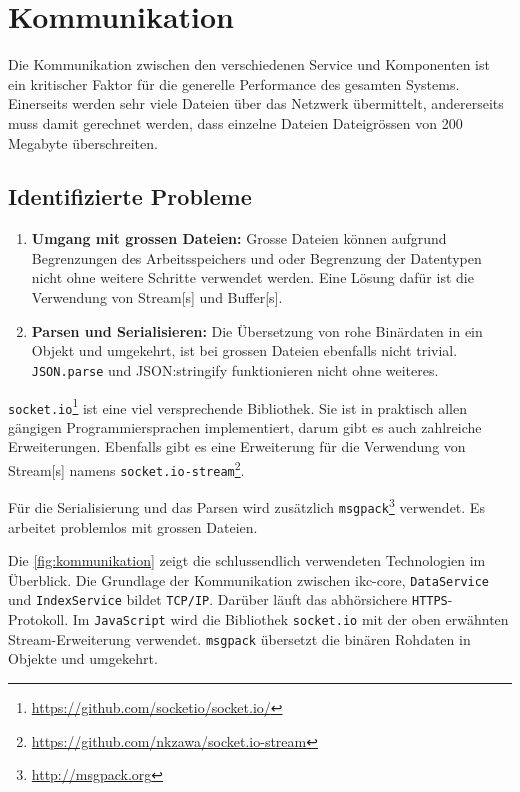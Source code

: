 \section{Kommunikation}

Die Kommunikation zwischen den verschiedenen Service und Komponenten ist ein kritischer Faktor für die generelle Performance des gesamten Systems. Einerseits werden sehr viele Dateien über das Ne\-tz\-we\-rk übermittelt, andererseits muss damit ge\-rech\-net werden, dass einzelne Dateien Dateigrössen von 200 Megabyte überschreiten.

\subsection{Identifizierte Probleme}
\begin{enumerate}
    \item \textbf{Umgang mit grossen Dateien:} Grosse Dateien können aufgrund Begrenzungen des Arbeitsspeichers und oder Begrenzung der Datentypen nicht ohne weitere Schritte verwendet werden. Eine Lösung dafür ist die Verwendung von \gls{Stream}[s] und \gls{Buffer}[s].
    \item \textbf{Parsen und Serialisieren:} Die Übersetzung von rohe Binärdaten in ein Objekt und umgekehrt, ist bei grossen Dateien ebenfalls nicht trivial. \texttt{JSON.parse} und {JSON:stringify} funktionieren nicht ohne weiteres.
\end{enumerate}

\texttt{socket.io}\footnote{\url{https://github.com/socketio/socket.io/}} ist eine viel versprechende Bibliothek. Sie ist in praktisch allen gängigen Programmiersprachen implementiert, darum gibt es auch zahlreiche Erweiterungen. Ebenfalls gibt es eine Erweiterung für die Verwendung von \gls{Stream}[s] namens \texttt{socket.io-stream}\footnote{\url{https://github.com/nkzawa/socket.io-stream}}.

Für die Serialisierung und das Parsen wird zusätzlich \texttt{msgpack}\footnote{\url{http://msgpack.org}} verwendet. Es arbeitet problemlos mit grossen Dateien.

Die \autoref{fig:kommunikation} zeigt die schlussendlich verwendeten Technologien im Überblick. Die Grundlage der Kommunikation zwischen \gls{ikc-core}, \texttt{DataService} und \texttt{IndexService} bildet \texttt{TCP/IP}. Darüber läuft das abhörsichere \texttt{HTTPS}-Protokoll. Im \texttt{JavaScript} wird die Bibliothek \texttt{socket.io} mit der oben erwähnten \gls{Stream}-Erweiterung verwendet. \texttt{msgpack} übersetzt die binären Rohdaten in Objekte und umgekehrt.



